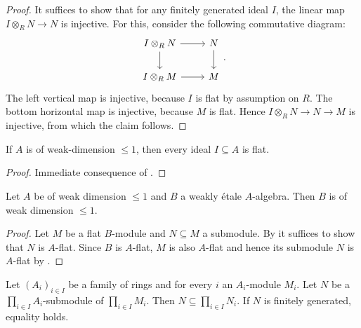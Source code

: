 \begin{proof}
    \leanok
    It suffices to show that for any finitely generated ideal $I$, the
    linear map $I \otimes_{R} N \to N$ is injective. For this, consider the following commutative
    diagram:
    \[
    \begin{tikzcd}
        I \otimes_{R} N \arrow{r} \arrow{d} & N \arrow{d} \\
        I \otimes_{R} M \arrow{r} & M
    \end{tikzcd}
    .\]
    The left vertical map is injective, because $I$ is flat by assumption on $R$. The bottom horizontal
    map is injective, because $M$ is flat. Hence $I \otimes_{R} N \to N \to M$ is injective,
    from which the claim follows.
\end{proof}

\begin{corollary}[\stacksproject{092S}, (1) => (2)]
    If $A$ is of weak-dimension $\le 1$, then every ideal $I \subseteq A$ is flat.
    \label{lemma:weak-dim-ideal-flat}
    \leanok
\end{corollary}

\begin{proof}
    \leanok
    Immediate consequence of .
\end{proof}

\begin{lemma}[\stacksproject{092E}]
    Let $A$ be of weak dimension $\le 1$ and $B$ a weakly étale $A$-algebra. Then
    $B$ is of weak dimension $\le 1$.
    \label{lemma:weakly-etale-preserve-weak-dim}
    \leanok
\end{lemma}

\begin{proof}
    Let $M$ be a flat $B$-module and $N \subseteq M$ a submodule. By
     it suffices to show that $N$ is $A$-flat.
    Since $B$ is $A$-flat, $M$ is also $A$-flat and hence its submodule $N$
    is $A$-flat by .
\end{proof}

\begin{lemma}
    Let $(A_i)_{i \in I}$ be a family of rings and for every $i$ an $A_i$-module $M_i$.
    Let $N$ be a $\prod_{i \in I} A_i$-submodule of $\prod_{i \in I} M_i$.
    Then $N \subseteq \prod_{i \in I} N_i$.
    If $N$ is finitely generated, equality holds.
    \label{lemma:prod-submodule-fg}
\end{lemma}

